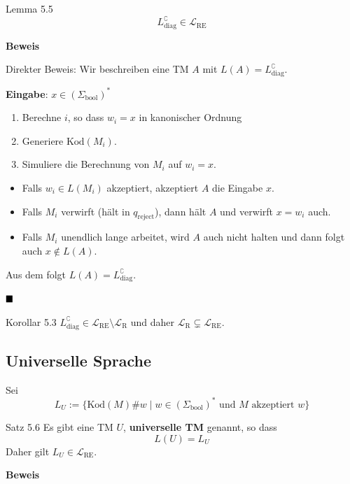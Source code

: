 \documentclass[a4paper, 11pt]{article}
\def\Lre{\mathcal{L}_\text{RE}}
\def\Lr{\mathcal{L}_\text{R}}
\begin{document}
            
            
              

                \begin{mainbox}{Lemma 5.5}
                    $$L_{\text{diag}}^{\complement} \in \Lre$$
                \end{mainbox}
                \textbf{Beweis}
                    
                
                    Direkter Beweis: Wir beschreiben eine TM $A$ mit $L(A) = L_{\text{diag}}^\complement$.
                    
                    \textbf{Eingabe}: $x \in (\Sigma_{\text{bool}})^*$
                    
                    \begin{enumerate}[label=(\roman*)]
                        \item Berechne $i$, so dass $w_i = x$ in kanonischer Ordnung
                        \item Generiere $\text{Kod}(M_i)$.
                        \item Simuliere die Berechnung von $M_i$ auf $w_i = x$. 
                    \end{enumerate}
                   
                
                    \begin{itemize}[label=-]
                        \item Falls $w_i \in L(M_i)$ akzeptiert, akzeptiert $A$ die Eingabe $x$.
                        \item Falls $M_i$ verwirft (hält in $q_{\text{reject}}$), dann hält $A$ und verwirft $x = w_i$ auch.
                        \item Falls $M_i$ unendlich lange arbeitet, wird $A$ auch nicht halten und dann folgt auch $x \notin L(A)$.  
                    \end{itemize}
                    Aus dem folgt $L(A) = L_{\text{diag}}^\complement$.
                
                    $\hfill\blacksquare$
                    \begin{subbox}{Korollar 5.3}
                        $L_{\text{diag}}^\complement \in \Lre \setminus \Lr$ und daher $\Lr \subsetneq \Lre$.
                    \end{subbox}
                
                
                
                    \subsection{Universelle Sprache}
                    Sei 
                    $$L_U := \{\text{Kod}(M)\#w \mid w \in (\Sigma_{\text{bool}})^* \text{ und } M \text{ akzeptiert }w\}$$
                    \begin{mainbox}{Satz 5.6}
                        Es gibt eine TM $U$, \textbf{universelle TM} genannt, so dass 
                        $$L(U) = L_U$$
                        Daher gilt $L_U \in \Lre$.
                    \end{mainbox} 
                    \textbf{Beweis}
                
\end{document}
